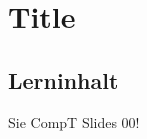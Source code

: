 \newcommand{\titleinfo}{Computertechnik 2 - Formelsammlung}
\newcommand{\authorinfo}{J.Rast}
\newcommand{\versioninfo}{$Revision: 991$}







\section{Title}

\subsection{Lerninhalt}
Sie CompT Slides 00!



